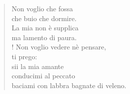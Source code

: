 \begin{verse}
Non voglio che fossa\\
che buio che dormire.\\
La mia non è supplica\\
ma lamento di paura.\\!
Non voglio vedere nè pensare,\\
ti prego:\\
sii la mia amante\\
conducimi al peccato\\
baciami con labbra bagnate di veleno.
\end{verse}